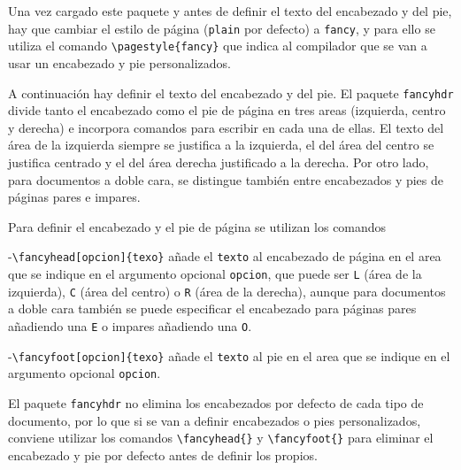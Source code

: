 \documentclass[
  spanish,
  a4paper,
]{scrreport}
\theoremstyle{definition}
\theoremstyle{remark}
\begin{document}
Una vez cargado este paquete y antes de definir el texto del encabezado
y del pie, hay que cambiar el estilo de página (\texttt{plain} por
defecto) a \texttt{fancy}, y para ello se utiliza el comando
\texttt{\textbackslash{}pagestyle\{fancy\}} que indica al compilador que
se van a usar un encabezado y pie personalizados.

A continuación hay definir el texto del encabezado y del pie. El paquete
\texttt{fancyhdr} divide tanto el encabezado como el pie de página en
tres areas (izquierda, centro y derecha) e incorpora comandos para
escribir en cada una de ellas. El texto del área de la izquierda siempre
se justifica a la izquierda, el del área del centro se justifica
centrado y el del área derecha justificado a la derecha. Por otro lado,
para documentos a doble cara, se distingue también entre encabezados y
pies de páginas pares e impares.

Para definir el encabezado y el pie de página se utilizan los comandos

-\texttt{\textbackslash{}fancyhead{[}opcion{]}\{texo\}} añade el
\texttt{texto} al encabezado de página en el area que se indique en el
argumento opcional \texttt{opcion}, que puede ser \texttt{L} (área de la
izquierda), \texttt{C} (área del centro) o \texttt{R} (área de la
derecha), aunque para documentos a doble cara también se puede
especificar el encabezado para páginas pares añadiendo una \texttt{E} o
impares añadiendo una \texttt{O}.

-\texttt{\textbackslash{}fancyfoot{[}opcion{]}\{texo\}} añade el
\texttt{texto} al pie en el area que se indique en el argumento opcional
\texttt{opcion}.

\begin{tcolorbox}[enhanced jigsaw, arc=.35mm, bottomrule=.15mm, bottomtitle=1mm, breakable, colback=white, colbacktitle=quarto-callout-warning-color!10!white, colframe=quarto-callout-warning-color-frame, coltitle=black, left=2mm, leftrule=.75mm, opacityback=0, opacitybacktitle=0.6, rightrule=.15mm, title=\textcolor{quarto-callout-warning-color}{\faExclamationTriangle}\hspace{0.5em}{Advertencia}, titlerule=0mm, toprule=.15mm, toptitle=1mm]

El paquete \texttt{fancyhdr} no elimina los encabezados por defecto de
cada tipo de documento, por lo que si se van a definir encabezados o
pies personalizados, conviene utilizar los comandos
\texttt{\textbackslash{}fancyhead\{\}} y
\texttt{\textbackslash{}fancyfoot\{\}} para eliminar el encabezado y pie
por defecto antes de definir los propios.

\end{tcolorbox}
\end{document}
